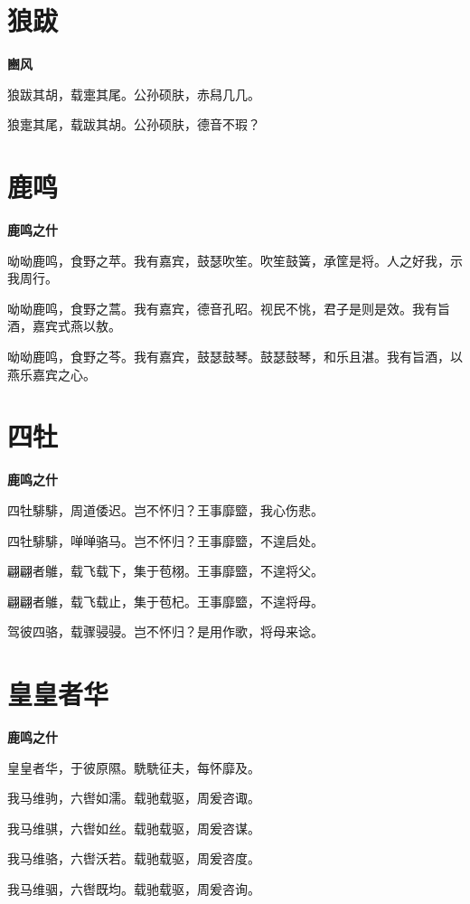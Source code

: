\documentclass[12pt,a4paper]{ctexbook}
\begin{document}
\section{狼跋}
\textbf{豳风}\par\vspace{0.5em}
狼跋其胡，载疐其尾。公孙硕肤，赤舄几几。\par
狼疐其尾，载跋其胡。公孙硕肤，德音不瑕？\par

\section{鹿鸣}
\textbf{鹿鸣之什}\par\vspace{0.5em}
呦呦鹿鸣，食野之苹。我有嘉宾，鼓瑟吹笙。吹笙鼓簧，承筐是将。人之好我，示我周行。\par
呦呦鹿鸣，食野之蒿。我有嘉宾，德音孔昭。视民不恌，君子是则是效。我有旨酒，嘉宾式燕以敖。\par
呦呦鹿鸣，食野之芩。我有嘉宾，鼓瑟鼓琴。鼓瑟鼓琴，和乐且湛。我有旨酒，以燕乐嘉宾之心。\par

\section{四牡}
\textbf{鹿鸣之什}\par\vspace{0.5em}
四牡騑騑，周道倭迟。岂不怀归？王事靡盬，我心伤悲。\par
四牡騑騑，啴啴骆马。岂不怀归？王事靡盬，不遑启处。\par
翩翩者鵻，载飞载下，集于苞栩。王事靡盬，不遑将父。\par
翩翩者鵻，载飞载止，集于苞杞。王事靡盬，不遑将母。\par
驾彼四骆，载骤骎骎。岂不怀归？是用作歌，将母来谂。\par

\section{皇皇者华}
\textbf{鹿鸣之什}\par\vspace{0.5em}
皇皇者华，于彼原隰。駪駪征夫，每怀靡及。\par
我马维驹，六辔如濡。载驰载驱，周爰咨诹。\par
我马维骐，六辔如丝。载驰载驱，周爰咨谋。\par
我马维骆，六辔沃若。载驰载驱，周爰咨度。\par
我马维骃，六辔既均。载驰载驱，周爰咨询。\par
\end{document}
